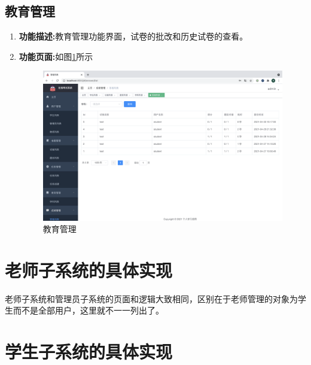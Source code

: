 \subsection{教育管理}
\begin{enumerate}
	\item[] \textbf{功能描述:}教育管理功能界面，试卷的批改和历史试卷的查看。
	\item[] \textbf{功能页面:}如图\ref{figure:dajuan}所示 \\
		\begin{figure}[H]
			\centering
			\includegraphics[width=1.0\textwidth,keepaspectratio]{data/chapter-5/dajuan.png}
			\caption{教育管理}
			\label{figure:dajuan}
		\end{figure}
\end{enumerate}

\section{老师子系统的具体实现}
老师子系统和管理员子系统的页面和逻辑大致相同，区别在于老师管理的对象为学生而不是全部用户，这里就不一一列出了。

\section{学生子系统的具体实现}
